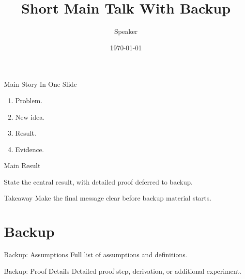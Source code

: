 \documentclass[10pt,aspectratio=169]{beamer}
\title{Short Main Talk With Backup}
\author{Speaker}
\date{\today}
\begin{document}
\begin{frame}\titlepage\end{frame}

\begin{frame}{Main Story In One Slide}
  \begin{enumerate}
    \item Problem.
    \item New idea.
    \item Result.
    \item Evidence.
  \end{enumerate}
\end{frame}

\begin{frame}{Main Result}
  \begin{theorem}
    State the central result, with detailed proof deferred to backup.
  \end{theorem}
\end{frame}

\begin{frame}{Takeaway}
  Make the final message clear before backup material starts.
\end{frame}

\appendix
\section{Backup}
\begin{frame}{Backup: Assumptions}
  Full list of assumptions and definitions.
\end{frame}

\begin{frame}{Backup: Proof Details}
  Detailed proof step, derivation, or additional experiment.
\end{frame}
\end{document}
